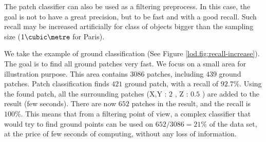 
		The patch classifier can also be used as a filtering preprocess.
		In this case, the goal is not to have a great precision, but to be fast and with a good recall.
		Such recall may be increased artificially for class of objects bigger than the sampling size ($1\cubic\metre$ for Paris).
		
		We take the example of ground classification (See Figure \ref{lod.fig:recall-increase}). 
		The goal is to find all ground patches very fast.
		We focus on a small area for illustration purpose. This area contains $3086$ patches, including $439$ ground patches.
		Patch classification finds $421$ ground patch, 
		with a recall of $92.7$\%.
		Using the found patch, all the surrounding patches (X,Y : $2$ \meter, Z : $0.5$ \meter ) are added to the result (few seconds).
		There are now $652$ patches in the result, and the recall is $100$\%.
		This means that from a filtering point of view, a complex classifier that would try to find ground points can be used on $652/3086=21\%$ of the data set, at the price of few seconds of computing, without any loss of information.
		
		
					 	  